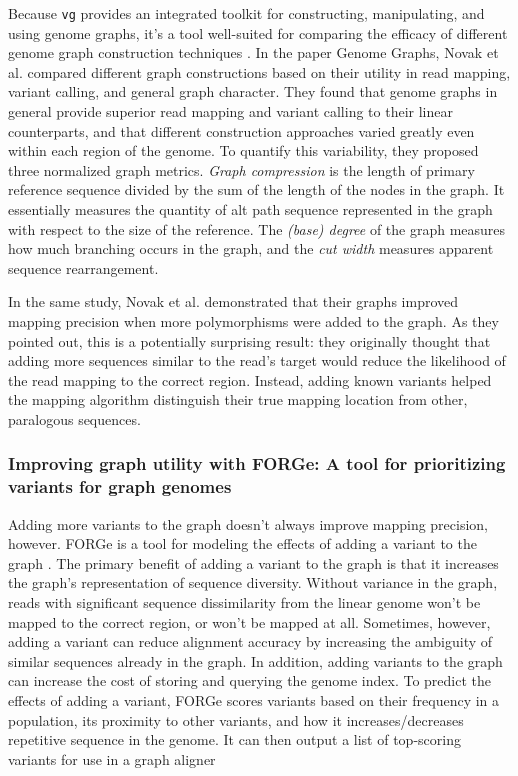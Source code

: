 Because \texttt{vg} provides an integrated toolkit for constructing, manipulating, and using genome graphs, it's a tool well-suited for comparing the efficacy of different genome graph construction techniques \cite{Novak_2017, Garrison_2018}. In the paper Genome Graphs, Novak et al. compared different graph constructions based on their utility in read mapping, variant calling, and general graph character.
They found that genome graphs in general provide superior read mapping and variant calling to their linear counterparts, and that different construction approaches varied greatly even within each region of the genome.
To quantify this variability, they proposed three normalized graph metrics.
 \emph{Graph compression} is the length of primary reference sequence divided by the sum of the length of the nodes in the graph.
It essentially measures the quantity of alt path sequence represented in the graph with respect to the size of the reference.
The \emph{(base) degree} of the graph measures how much branching occurs in the graph, and the \emph{cut width} measures apparent sequence rearrangement.


In the same study, Novak et al. demonstrated that their graphs improved mapping precision when more polymorphisms were added to the graph.
As they pointed out, this is a potentially surprising result: they originally thought that adding more sequences similar to the read's target would reduce the likelihood of the read mapping to the correct region.
Instead, adding known variants helped the mapping algorithm distinguish their true mapping location from other, paralogous sequences.

\subsubsection{Improving graph utility with FORGe: A tool for prioritizing variants for graph genomes}

Adding more variants to the graph doesn't always improve mapping precision, however.
FORGe is a tool for modeling the effects of adding a variant to the graph \cite{Pritt_2018}. 
The primary benefit of adding a variant to the graph is that it increases the graph's representation of sequence diversity.
Without variance in the graph, reads with significant sequence dissimilarity from the linear genome won't be mapped to the correct region, or won't be mapped at all.
Sometimes, however, adding a variant can reduce alignment accuracy by increasing the ambiguity of similar sequences already in the graph.
In addition, adding variants to the graph can increase the cost of storing and querying the genome index.
To predict the effects of adding a variant, FORGe scores variants based on their frequency in a population, its proximity to other variants, and how it increases/decreases repetitive sequence in the genome.
It can then output a list of top-scoring variants for use in a graph aligner


